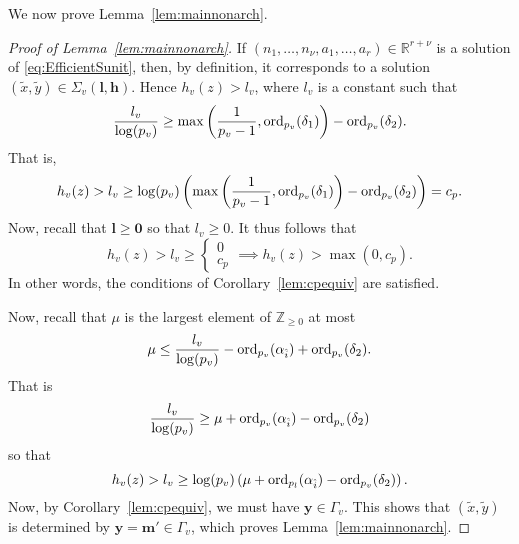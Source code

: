 We now prove Lemma~\ref{lem:mainnonarch}. 

\begin{proof}[Proof of Lemma~\ref{lem:mainnonarch}]
If $(n_1, \dots, n_{\nu}, a_1, \dots, a_r) \in \mathbb{R}^{r+\nu}$ is a solution of \eqref{eq:EfficientSunit}, then, by definition, it corresponds to a solution $(\tilde{x},\tilde{y}) \in \Sigma_v(\mathbf{l},\mathbf{h})$. 
Hence $h_v(z)>l_v$, where $l_v$ is a constant such that
\[\frac{l_v}{\log(p_v)} \geq \max\left( \frac{1}{p_v-1}, \operatorname{ord}_{p_v}(\delta_1)\right) - \operatorname{ord}_{p_v}(\delta_2).\]
That is, 
\[h_v(z) > l_v \geq \log(p_v)\left(\max\left( \frac{1}{p_v-1}, \operatorname{ord}_{p_v}(\delta_1)\right) - \operatorname{ord}_{p_v}(\delta_2)\right) = c_p.\]
Now, recall that $\mathbf{l} \geq \mathbf{0}$ so that $l_v \geq 0$. It thus follows that 
\[h_v(z) > l_v \geq
\begin{cases}
0\\
c_p
\end{cases}
\implies h_v(z) >\max(0,c_p).\]
In other words, the conditions of Corollary~\ref{lem:cpequiv} are satisfied. 

Now, recall that $\mu$ is the largest element of $\mathbb{Z}_{\geq 0}$ at most
\[\mu \leq \frac{l_v}{\log(p_v)} - \operatorname{ord}_{p_v}(\alpha_{\hat{i}}) + \operatorname{ord}_{p_v}(\delta_2).\]
That is
\[\frac{l_v}{\log(p_v)} \geq \mu + \operatorname{ord}_{p_v}(\alpha_{\hat{i}}) - \operatorname{ord}_{p_v}(\delta_2)\]
so that
\[h_v(z) > l_v \geq \log(p_v)\left(\mu + \operatorname{ord}_{p_l}(\alpha_{\hat{i}}) - \operatorname{ord}_{p_v}(\delta_2)\right).\]
Now, by Corollary~\ref{lem:cpequiv}, we must have $\mathbf{y} \in \Gamma_v$. This shows that $(\tilde{x},\tilde{y})$ is determined by $\mathbf{y}=\mathbf{m}'\in\Gamma_v$, which proves Lemma~\ref{lem:mainnonarch}.
%
\end{proof}

